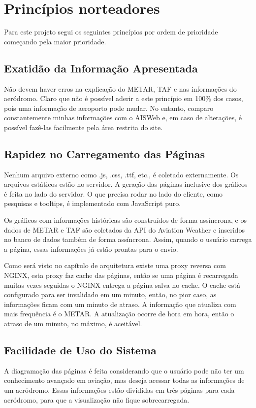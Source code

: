 \chapter{Princípios norteadores}

Para este projeto segui os seguintes princípios por ordem de prioridade começando
pela maior prioridade.

\section{Exatidão da Informação Apresentada}
Não devem haver erros na explicação do METAR, TAF e nas informações do aeródromo. 
Claro que não é possível aderir a este princípio em 100\% dos casos, pois uma 
informação de aeroporto pode mudar. No entanto, comparo constantemente minhas 
informações com o AISWeb e, em caso de alterações, é possível fazê-las facilmente
pela área restrita do site.

\section{Rapidez no Carregamento das Páginas} Nenhum arquivo externo como .js, 
.css, .ttf, etc., é coletado externamente. Os arquivos estáticos estão no servidor. 
A geração das páginas inclusive dos gráficos é feita no lado do servidor. O que 
precisa rodar no lado do cliente, como pesquisas e tooltips, é implementado com 
JavaScript puro.

Os gráficos com informações históricas são construídos de forma assíncrona, e os
dados de METAR e TAF são coletados da API do Aviation Weather e inseridos no
banco de dados também de forma assíncrona. Assim, quando o usuário carrega a 
página, essas informações já estão prontas para o envio.

Como será visto no capítulo de arquitetura existe uma proxy reversa com NGINX,
esta proxy faz cache das páginas, então se uma página é recarregada muitas vezes
seguidas o NGINX entrega a página salva no cache. O cache está configurado para
ser invalidado em um minuto, então, no pior caso, as informações ficam com um 
minuto de atraso. A informação que atualiza com mais frequência é o METAR. A
atualização ocorre de hora em hora, então o atraso de um minuto, no máximo, é
aceitável.

\section{Facilidade de Uso do Sistema} A diagramação das páginas é feita
considerando que o usuário pode não ter um conhecimento avançado em aviação, mas
deseja acessar todas as informações de um aeródromo. Essas informações estão 
divididas em três páginas para cada aeródromo, para que a visualização não fique 
sobrecarregada.